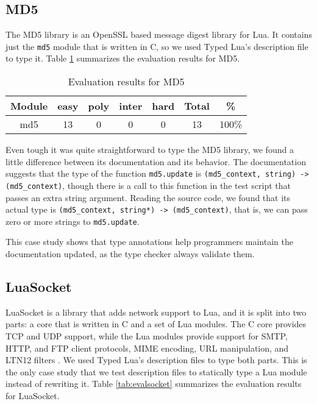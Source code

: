 \subsection{MD5}

The MD5 library is an OpenSSL based message digest library for Lua.
It contains just the \texttt{md5} module that is written in C,
so we used Typed Lua's description file to type it.
Table \ref{tab:evalmd5} summarizes the evaluation results for MD5.

\begin{table}[!ht]
\begin{center}
\begin{tabular}{|c|c|c|c|c|c|c|}
\hline
\textbf{Module} & \textbf{easy} & \textbf{poly} & \textbf{inter} & \textbf{hard} & \textbf{Total} & \textbf{\%} \\
\hline
md5 & 13 & 0 & 0 & 0 & 13 & 100\% \\
\hline
\end{tabular}
\end{center}
\caption{Evaluation results for MD5}
\label{tab:evalmd5}
\end{table}

Even tough it was quite straightforward to type the MD5 library,
we found a little difference between its documentation and its behavior.
The documentation suggests that the type of the function \texttt{md5.update}
is \texttt{(md5\string_context, string) -> (md5\string_context)},
though there is a call to this function in the test script that passes
an extra string argument.
Reading the source code, we found that its actual type is
\texttt{(md5\string_context, string*) -> (md5\string_context)},
that is, we can pass zero or more strings to \texttt{md5.update}.

This case study shows that type annotations help programmers maintain the
documentation updated, as the type checker always validate them.

\subsection{LuaSocket}

LuaSocket is a library that adds network support to Lua,
and it is split into two parts: a core that is written in C and a set of
Lua modules.
The C core provides TCP and UDP support, while the Lua modules provide
support for SMTP, HTTP, and FTP client protocols, MIME encoding,
URL manipulation, and LTN12 filters \citep{nehab2008ltn012}.
We used Typed Lua's description files to type both parts.
This is the only case study that we test description files to statically type
a Lua module instead of rewriting it.
Table \ref{tab:evalsocket} summarizes the evaluation results for LuaSocket.

